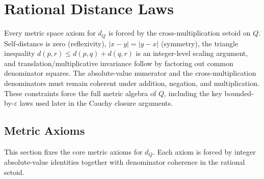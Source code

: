 \documentclass[11pt,a4paper]{book}
\def\mathbb#1{#1}%
\begin{document}
\chapter{Rational Distance Laws}
\label{ch:rat-dist}

Every metric space axiom for $d_{\mathbb{Q}}$ is forced by the
cross-multiplication setoid on $\mathbb{Q}$. Self-distance is zero
(reflexivity), $|x-y| = |y-x|$ (symmetry), the triangle inequality
$d(p,r) \le d(p,q) + d(q,r)$ is an integer-level
scaling argument, and translation/multiplicative invariance follow by
factoring out common denominator squares.
The absolute-value numerator and the cross-multiplication denominators must
remain coherent under addition, negation, and multiplication.  These
constraints force the full metric algebra of $\mathbb{Q}$, including the key
bounded-by-$\varepsilon$ laws used later in the Cauchy closure arguments.

\section{Metric Axioms}

This section fixes the core metric axioms for $d_{\mathbb{Q}}$.  Each axiom is
forced by integer absolute-value identities together with denominator
coherence in the rational setoid.
\end{document}
